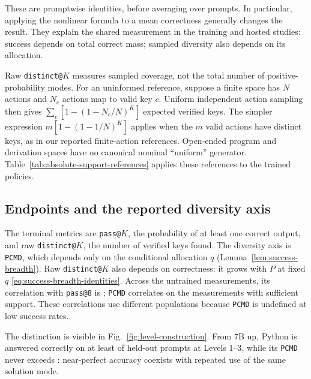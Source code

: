 \documentclass{article}
\newcommand{\1}{\mathbf 1}
\newcommand{\pmd}{\texttt{PCMD}}
\theoremstyle{remark}
\theoremstyle{definition}
\theoremstyle{plain}
\begin{document}
These are promptwise identities, before averaging over prompts. In particular,
applying the nonlinear formula to a mean correctness generally changes the
result. They explain the shared measurement in the training and hosted
studies: success depends on total correct mass; sampled diversity also depends
on its allocation.

Raw \texttt{distinct@}$K$ measures sampled coverage, not the total number of
positive-probability modes. For an uninformed reference, suppose a finite
space has $N$ actions and $N_c$ actions map to valid key $c$. Uniform
independent action sampling then gives $\sum_c[1-(1-N_c/N)^K]$ expected
verified keys. The simpler expression $m[1-(1-1/N)^K]$ applies when the $m$
valid actions have distinct keys, as in our reported finite-action references.
Open-ended program and derivation spaces have no canonical nominal
``uniform'' generator. Table~\ref{tab:absolute-support-references} applies these
references to the trained policies.

\subsection{Endpoints and the reported diversity axis}
\label{app:reported-endpoints}

The terminal metrics are \texttt{pass@}$K$, the probability of at least one
correct output, and raw \texttt{distinct@}$K$, the number of verified keys
found. The diversity axis is \pmd{}, which depends only on the conditional
allocation $q$ (Lemma~\ref{lem:success-breadth}). Raw \texttt{distinct@}$K$
also depends on correctness: it grows with $P$ at fixed $q$
\eqref{eq:success-breadth-identities}. Across the \MDcells{} untrained
measurements, its correlation with \texttt{pass@8} is \MDdistinctcorr{};
\pmd{} correlates \MDpmdcorr{} on the \MDreportable{} measurements with
sufficient support. These correlations use different populations because
\pmd{} is undefined at low success rates.

The distinction is visible in Fig.~\ref{fig:level-construction}. From 7B up,
Python is answered correctly on at least \MDpyPasslo{} of held-out prompts
at Levels 1--3, while its \pmd{} never exceeds \MDpyPmdhi{}: near-perfect
accuracy coexists with repeated use of the same solution mode.
\end{document}
